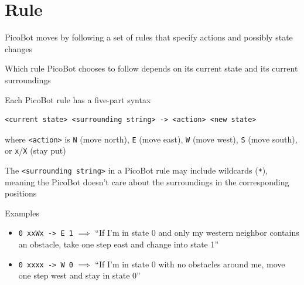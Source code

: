 \documentclass[8pt,a4paper,compress]{beamer}
\begin{document}
\section{Rule}
\begin{frame}[fragile]
\pause

PicoBot moves by following a set of rules that specify actions and possibly state changes

\pause
\bigskip

Which rule PicoBot chooses to follow depends on its current state and its current surroundings

\pause
\bigskip

Each PicoBot rule has a five-part syntax
\begin{lstlisting}[language={}]
<current state> <surrounding string> -> <action> <new state>
\end{lstlisting}
where \lstinline{<action>} is \lstinline{N} (move north), \lstinline{E} (move east), \lstinline{W} (move west), \lstinline{S} (move south), or \lstinline{x}/\lstinline{X} (stay put)

\pause
\bigskip

The \lstinline{<surrounding string>} in a PicoBot rule may include wildcards (\lstinline{*}), meaning the PicoBot doesn't care about the surroundings in the corresponding positions

\pause
\bigskip

Examples
\begin{itemize}
\item \lstinline{0 xxWx -> E 1} $\implies$ ``If I'm in state 0 and only my western neighbor contains an obstacle, take one step east and change into state 1''

\item \lstinline{0 xxxx -> W 0} $\implies$ ``If I'm in state 0 with no obstacles around me, move one step west and stay in state 0''
\end{itemize}
\end{frame}
\end{document}

